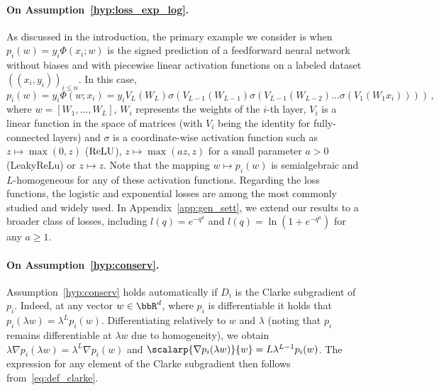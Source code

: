 \paragraph{On Assumption~\ref{hyp:loss_exp_log}.} As discussed in the introduction, the primary example we consider is when $p_i(w) = y_i \Phi(x_i;w)$ is the signed prediction of a feedforward neural network without biases and with piecewise linear activation functions on a labeled dataset $((x_i,y_i))_{i \leq n}$. In this case,
\begin{equation}\label{eq:NN}
 p_i(w) = y_i \Phi(w;x_i) = y_i V_L(W_L) \sigma(V_{L-1}(W_{L-1}) \sigma(V_{L-1}(W_{L-2}) \ldots \sigma(V_{1}(W_1 x_i))))\, ,
\end{equation}
where $w = [W_1, \ldots, W_L]$, $W_i$ represents the weights of the $i$-th layer, $V_i$ is a linear function in the space of matrices (with $V_i$ being the identity for fully-connected layers) and $\sigma$ is a coordinate-wise activation function such as $z \mapsto \max(0,z)$ ($\operatorname{ReLU}$), $z \mapsto \max(az, z)$ for a small parameter $a>0$ (LeakyReLu) or $z \mapsto z$. Note that the mapping $w \mapsto p_i(w)$ is semialgebraic and $L$-homogeneous for any of these activation functions. Regarding the loss functions, the logistic and exponential losses are among the most commonly studied and widely used. In Appendix~\ref{app:gen_sett}, we extend our results to a broader class of losses, including $l(q) = e^{-q^a}$ and $l(q) = \ln (1 + e^{-q^a})$ for any $a \geq 1$.

\paragraph{On Assumption~\ref{hyp:conserv}.} Assumption~\ref{hyp:conserv} holds automatically  if $D_i$ is the Clarke subgradient of $p_i$. Indeed, at any vector $w \in \bbR^d$, where $p_i$ is differentiable it holds that $p_i(\lambda w) = \lambda^{L} p_i(w)$. Differentiating relatively to $w$ and $\lambda$ (noting that $p_i$ remains differentiable at $\lambda w$ due to homogeneity), we obtain $\lambda \nabla p_i(\lambda w) = \lambda^{L} \nabla p_i(w)$ and $\scalarp{\nabla p_i(\lambda w)}{w} = L \lambda^{L-1} p_i(w)$. The expression for any element of the Clarke subgradient then follows from~\eqref{eq:def_clarke}. 

